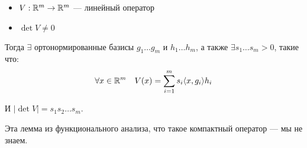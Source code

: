 

\cfoot{}



\begin{lemma}\itemfix
    \begin{itemize}
        \item \(V : \mathbb{R}^m \to \mathbb{R}^m\) --- линейный оператор
        \item \(\det V \neq 0\)
    \end{itemize}
    Тогда \(\exists \) ортонормированные базисы \(g_1 \dots g_m\) и \(h_1 \dots h_m\), а также \(\exists s_1 \dots s_m > 0\), такие что:
    \[\forall x\in\mathbb{R}^m \quad V(x) = \sum_{i = 1}^m s_i\langle x, g_i\rangle h_i\]

    И \(|\det V| = s_1s_2 \dots s_m\).
\end{lemma}

\begin{remark}
    Эта лемма из функционального анализа, что такое компактный оператор --- мы не знаем.
\end{remark}

